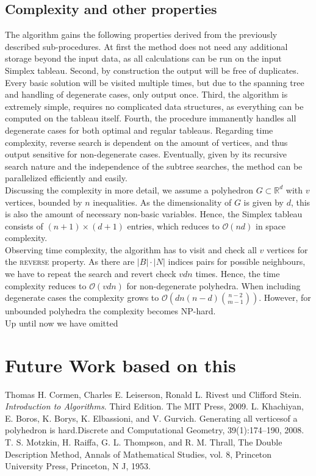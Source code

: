 \documentclass[a4paper, 11pt]{article}
\begin{document}
\subsection{Complexity and other properties}
The algorithm gains the following properties derived from the previously described sub-procedures. At first the method does not need any additional storage beyond the input data, as all calculations can be run on the input Simplex tableau. Second, by construction the output will be free of duplicates. Every basic solution will be visited multiple times, but due to the spanning tree and handling of degenerate cases, only output once. Third, the algorithm is extremely simple, requires no complicated data structures, as everything can be computed on the tableau itself. Fourth, the procedure immanently handles all degenerate cases for both optimal and regular tableaus. Regarding time complexity, reverse search is dependent on the amount of vertices, and thus output sensitive for non-degenerate cases.
Eventually, given by its recursive search nature and the independence of the subtree searches, the method can be parallelized efficiently and easily.\\

Discussing the complexity in more detail, we assume a polyhedron $G\subset\mathbb{R}^d$ with $v$ vertices, bounded by $n$ inequalities. As the dimensionality of $G$ is given by $d$, this is also the amount of necessary non-basic variables. Hence, the Simplex tableau consists of $(n+1)\times (d+1)$ entries, which reduces to $\mathcal{O}(nd)$ in space complexity. \\
Observing time complexity, the algorithm has to visit and check all $v$ vertices for the \textsc{reverse} property. As there are $|B|\cdot|N|$ indices pairs for  possible neighbours, we have to repeat the search and revert check $vdn$ times. Hence, the time complexity reduces to $\mathcal{O}(vdn)$ for non-degenerate polyhedra. When including degenerate cases the complexity grows to $\mathcal{O}\left( dn(n-d){n-2\choose m-1} \right)$. However, for unbounded polyhedra the complexity becomes NP-hard.\\

Up until now we have omitted 

\section{Future Work based on this }

\newpage

\begin{thebibliography}{9}
	Thomas H. Cormen, Charles E. Leiserson, Ronald L. Rivest und Clifford Stein.
	\textit{Introduction to Algorithms}. Third Edition. The MIT Press, 2009.
	L. Khachiyan, E. Boros, K. Borys, K. Elbassioni, and V. Gurvich. Generating all
	verticesof a polyhedron is hard.Discrete and Computational Geometry,
	39(1):174–190, 2008.
	T. S. Motzkin, H. Raiffa, G. L. Thompson, and R. M. Thrall, The Double Description Method,
	Annals of Mathematical Studies, vol. 8, Princeton University Press, Princeton, N J, 1953.
\end{thebibliography}
\end{document}
